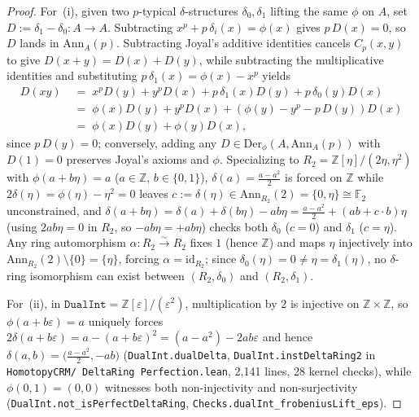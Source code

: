 \begin{proof}
For~(i), given two $p$-typical $\delta$-structures $\delta_0, \delta_1$ lifting the same $\phi$ on $A$, set $D := \delta_1 - \delta_0 : A \to A$. Subtracting $x^p + p\,\delta_i(x) = \phi(x)$ gives $p\,D(x) = 0$, so $D$ lands in $\mathrm{Ann}_A(p)$. Subtracting Joyal's additive identities cancels $C_p(x, y)$ to give $D(x + y) = D(x) + D(y)$, while subtracting the multiplicative identities and substituting $p\,\delta_1(x) = \phi(x) - x^p$ yields
\[
  \begin{aligned}
    D(xy) &\;=\; x^p D(y) + y^p D(x) + p\,\delta_1(x) D(y) + p\,\delta_0(y) D(x) \\
    &\;=\; \phi(x) D(y) + y^p D(x) + (\phi(y) - y^p - p\,D(y)) D(x) \\
    &\;=\; \phi(x) D(y) + \phi(y) D(x),
  \end{aligned}
\]
since $p\,D(y) = 0$; conversely, adding any $D \in \mathrm{Der}_\phi(A, \mathrm{Ann}_A(p))$ with $D(1) = 0$ preserves Joyal's axioms and $\phi$. Specializing to $R_2 = \mathbb{Z}[\eta]/(2\eta, \eta^2)$ with $\phi(a + b\eta) = a$ ($a \in \mathbb{Z}$, $b \in \{0, 1\}$), $\delta(a) = \frac{a - a^2}{2}$ is forced on $\mathbb{Z}$ while $2\delta(\eta) = \phi(\eta) - \eta^2 = 0$ leaves $c := \delta(\eta) \in \mathrm{Ann}_{R_2}(2) = \{0, \eta\} \cong \mathbb{F}_2$ unconstrained, and $\delta(a + b\eta) = \delta(a) + \delta(b\eta) - ab\eta = \frac{a - a^2}{2} + (ab + c\cdot b)\eta$ (using $2ab\eta = 0$ in $R_2$, so $-ab\eta = +ab\eta$) checks both $\delta_0$ ($c = 0$) and $\delta_1$ ($c = \eta$). Any ring automorphism $\alpha : R_2 \xrightarrow{\sim} R_2$ fixes $1$ (hence $\mathbb{Z}$) and maps $\eta$ injectively into $\mathrm{Ann}_{R_2}(2) \setminus \{0\} = \{\eta\}$, forcing $\alpha = \mathrm{id}_{R_2}$; since $\delta_0(\eta) = 0 \neq \eta = \delta_1(\eta)$, no $\delta$-ring isomorphism can exist between $(R_2, \delta_0)$ and $(R_2, \delta_1)$.

For~(ii), in $\mathtt{DualInt} = \mathbb{Z}[\varepsilon]/(\varepsilon^2)$, multiplication by $2$ is injective on $\mathbb{Z} \times \mathbb{Z}$, so $\phi(a + b\varepsilon) = a$ uniquely forces $2\delta(a + b\varepsilon) = a - (a + b\varepsilon)^2 = (a - a^2) - 2ab\varepsilon$ and hence $\delta(a, b) = \bigl(\frac{a - a^2}{2}, -ab\bigr)$ (\texttt{DualInt.dualDelta}, \texttt{DualInt.instDeltaRing2} in \texttt{HomotopyCRM/ DeltaRing Perfection.lean}, 2,141 lines, 28 kernel checks), while $\phi(0, 1) = (0, 0)$ witnesses both non-injectivity and non-surjectivity (\texttt{DualInt.not\_isPerfectDeltaRing}, \texttt{Checks.dualInt\_frobeniusLift\_eps}).
\end{proof}


